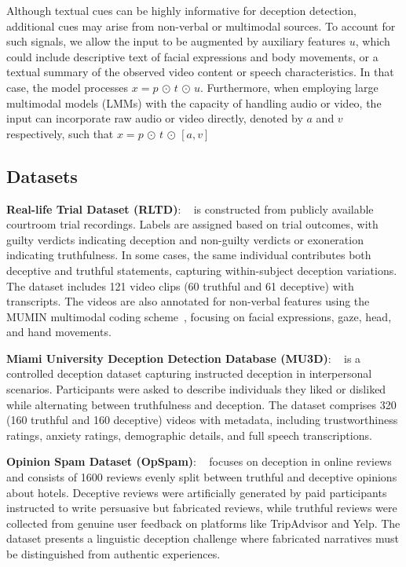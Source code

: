 Although textual cues can be highly informative for deception detection, additional cues may arise from non-verbal or multimodal sources. To account for such signals, we allow the input to be augmented by auxiliary features \( u \), which could include descriptive text of facial expressions and body movements, or a textual summary of the observed video content or speech characteristics. In that case, the model processes
\(
x = p \,\odot\, t \,\odot\, u.
\)
Furthermore, when employing large multimodal models (LMMs) with the capacity of handling audio or video, the input can incorporate raw audio or video directly, denoted by \( a \) and \( v \) respectively, such that
\(
x = p \,\odot\, t \,\odot\, [a, v]
\)

\subsection{Datasets}

\textbf{Real-life Trial Dataset (RLTD)}: ~\cite{rltd} is constructed from publicly available courtroom trial recordings. Labels are assigned based on trial outcomes, with guilty verdicts indicating deception and non-guilty verdicts or exoneration indicating truthfulness. In some cases, the same individual contributes both deceptive and truthful statements, capturing within-subject deception variations. The dataset includes 121 video clips (60 truthful and 61 deceptive) with transcripts. The videos are also annotated for non-verbal features using the MUMIN multimodal coding scheme~\cite{mumin}, focusing on facial expressions, gaze, head, and hand movements.

\textbf{Miami University Deception Detection Database (MU3D)}: ~\cite{mu3d} is a controlled deception dataset capturing instructed deception in interpersonal scenarios. Participants were asked to describe individuals they liked or disliked while alternating between truthfulness and deception. The dataset comprises 320 (160 truthful and 160 deceptive) videos with metadata, including trustworthiness ratings, anxiety ratings, demographic details, and full speech transcriptions.

\textbf{Opinion Spam Dataset (OpSpam)}: ~\cite{opspam} focuses on deception in online reviews and consists of 1600 reviews evenly split between truthful and deceptive opinions about hotels. Deceptive reviews were artificially generated by paid participants instructed to write persuasive but fabricated reviews, while truthful reviews were collected from genuine user feedback on platforms like TripAdvisor and Yelp. The dataset presents a linguistic deception challenge where fabricated narratives must be distinguished from authentic experiences.

